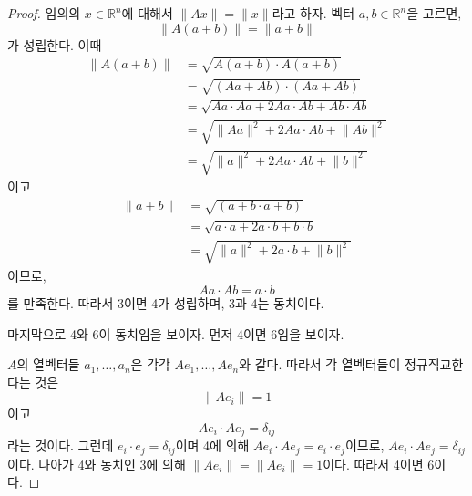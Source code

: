 \documentclass[unfonts,oneside,a4paper]{oblivoir}
\theoremstyle{definition}
\theoremstyle{theorem}
\theoremstyle{theorem}
\theoremstyle{remark}
\theoremstyle{remark}
\theoremstyle{remark}
\theoremstyle{remark}
\renewcommand{\vec}[1]{\bm{\mathit{#1}}}
\begin{document}
\begin{proof}
    임의의 $\vec x \in \mathbb R^n$에 대해서 $\lVert A \vec x \rVert = \lVert \vec x \rVert$라고 하자.
    벡터 $\vec a, \vec b \in \mathbb R^n$을 고르면,
    \begin{equation*}
        \lVert A (\vec a + \vec b) \rVert = \lVert \vec a + \vec b \rVert
    \end{equation*}
    가 성립한다.
    이때
    \begin{align*}
        \lVert A (\vec a + \vec b) \rVert &= \sqrt{A (\vec a + \vec b) \cdot A (\vec a + \vec b) }\\
                                          &= \sqrt{(A \vec a + A \vec b) \cdot (A \vec a + A \vec b)}\\
                                          &= \sqrt{A \vec a \cdot A \vec a + 2A \vec a \cdot A \vec b + A \vec b \cdot A \vec b}\\
                                          &= \sqrt{\lVert A \vec a \rVert^2 + 2A \vec a \cdot A \vec b + \lVert A \vec b \rVert^2}\\
                                          &= \sqrt{\lVert \vec a \rVert^2 + 2A \vec a \cdot A \vec b + \lVert \vec b \rVert^2}
    \end{align*}
    이고
    \begin{align*}
        \lVert \vec a + \vec b \rVert &= \sqrt{(\vec a + \vec b \cdot \vec a + \vec b)}\\
                                      &= \sqrt{\vec a \cdot \vec a + 2 \vec a \cdot \vec b + \vec b \cdot \vec b}\\
                                      &= \sqrt{\lVert \vec a \rVert^2 + 2 \vec a \cdot \vec b + \lVert \vec b \rVert^2}
    \end{align*}
    이므로,
    \begin{equation*}
        A \vec a \cdot A \vec b = \vec a \cdot \vec b
    \end{equation*}
    를 만족한다.
    따라서 3이면 4가 성립하며, 3과 4는 동치이다.

    마지막으로 4와 6이 동치임을 보이자. 먼저 4이면 6임을 보이자.

    $A$의 열벡터들 $\vec a_1, \dots, \vec a_n$은 각각 $A \vec e_1, \dots, A \vec e_n$와 같다.
    따라서 각 열벡터들이 정규직교한다는 것은
    \begin{equation*}
        \lVert A \vec e_i \rVert = 1
    \end{equation*}
    이고
    \begin{equation*}
        A \vec e_i \cdot A \vec e_j = \delta_{ij}
    \end{equation*}
    라는 것이다.
    그런데 $\vec e_i \cdot \vec e_j = \delta_{ij}$이며 4에 의해 $A \vec e_i \cdot A \vec e_j = \vec e_i \cdot \vec e_j$이므로, $A \vec e_i \cdot A \vec e_j = \delta_{ij}$이다.
    나아가 4와 동치인 3에 의해 $\lVert A \vec e_i\rVert = \lVert A \vec e_i \rVert = 1$이다.
    따라서 4이면 6이다.


\end{proof}
\end{document}
